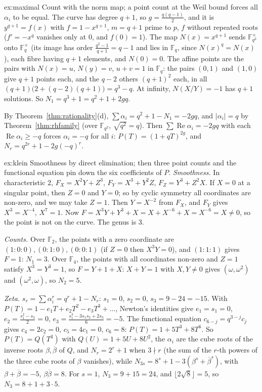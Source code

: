 \begin{solution}{ex:maximal}
\idea Count with the norm map; a point count at the Weil bound forces all $\alpha_i$ to be equal.
\writeup The curve has degree $q+1$, so $g=\frac{q(q-1)}2$, and it is $y^{q+1}=f(x)$ with $f=1-x^{q+1}$, $m=q+1$ prime to $p$, $f$ without repeated roots
($f'=-x^q$ vanishes only at $0$, and $f(0)=1$). The map $N(x)=x^{q+1}$ sends $\mathbb F_{q^2}^\times$ onto $\mathbb F_q^\times$ (its image has order
$\frac{q^2-1}{q+1}=q-1$ and lies in $\mathbb F_q$, since $N(x)^q=N(x)$), each fibre having $q+1$ elements, and $N(0)=0$. The affine points are the pairs with
$N(x)=u$, $N(y)=v$, $u+v=1$ in $\mathbb F_q$: the pairs $(0,1)$ and $(1,0)$ give $q+1$ points each, and the $q-2$ others $(q+1)^2$ each, in all
$(q+1)\bigl(2+(q-2)(q+1)\bigr)=q^3-q$. At infinity, $N(X/Y)=-1$ has $q+1$ solutions. So $N_1=q^3+1=q^2+1+2gq$.

By Theorem~\ref{thm:rationality}(d), $\sum\alpha_i=q^2+1-N_1=-2gq$, and $|\alpha_i|=q$ by Theorem~\ref{thm:rhfamily} (over $\mathbb F_{q^2}$, $\sqrt{q^2}=q$). Then
$\sum\operatorname{Re}\alpha_i=-2gq$ with each $\operatorname{Re}\alpha_i\ge-q$ forces $\alpha_i=-q$ for all $i$: $P(T)=(1+qT)^{2g}$, and $N_r=q^{2r}+1-2g(-q)^r$.
\end{solution}

\begin{solution}{ex:klein}
\idea Smoothness by direct elimination; then three point counts and the functional equation pin down the six coefficients of $P$.
\writeup \emph{Smoothness.} In characteristic $2$, $F_X=X^2Y+Z^3$, $F_Y=X^3+Y^2Z$, $F_Z=Y^3+Z^2X$. If $X=0$ at a singular point, then $Z=0$ and $Y=0$; so
by cyclic symmetry all coordinates are non-zero, and we may take $Z=1$. Then $Y=X^{-2}$ from $F_X$, and $F_Y$ gives $X^3=X^{-4}$, $X^7=1$. Now
$F=X^3Y+Y^3+X=X+X^{-6}+X=X^{-6}=X\ne0$, so the point is not on the curve. The genus is $3$.

\emph{Counts.} Over $\mathbb F_2$, the points with a zero coordinate are $(1:0:0),(0:1:0),(0:0:1)$ (if $Z=0$ then $X^3Y=0$), and $(1:1:1)$ gives $F=1$: $N_1=3$. Over
$\mathbb F_4$, the points with all coordinates non-zero and $Z=1$ satisfy $X^3=Y^3=1$, so $F=Y+1+X$: $X+Y=1$ with $X,Y\ne0$ gives $(\omega,\omega^2)$ and
$(\omega^2,\omega)$, so $N_2=5$.

\emph{Zeta.} $s_r=\sum\alpha_i^r=q^r+1-N_r$: $s_1=0$, $s_2=0$, $s_3=9-24=-15$. With $P(T)=1-e_1T+e_2T^2-e_3T^3+\dots$, Newton's identities give $e_1=s_1=0$,
$e_2=\frac{s_1^2-s_2}2=0$, $e_3=\frac{s_1^3-3s_1s_2+2s_3}6=-5$. The functional equation $c_{6-j}=q^{3-j}c_j$ gives $c_4=2c_2=0$, $c_5=4c_1=0$, $c_6=8$:
$P(T)=1+5T^3+8T^6$. So $P(T)=Q(T^3)$ with $Q(U)=1+5U+8U^2$, the $\alpha_i$ are the cube roots of the inverse roots $\beta,\overline\beta$ of $Q$, and
$N_r=2^r+1$ when $3\nmid r$ (the sum of the $r$-th powers of the three cube roots of $\beta$ vanishes), while $N_{3s}=8^s+1-3(\beta^s+\overline\beta^s)$, with
$\beta+\overline\beta=-5$, $\beta\overline\beta=8$. For $s=1$, $N_3=9+15=24$, and $\lfloor2\sqrt8\rfloor=5$, so $N_3=8+1+3\cdot5$.
\end{solution}

